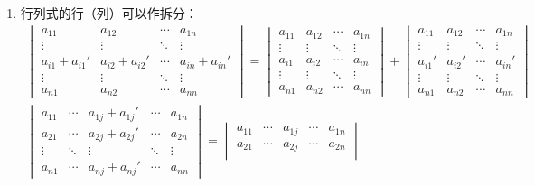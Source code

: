 \begin{property}
\begin{enumerate}
\begin{gather*}
\begin{vmatrix}
				a_{21} & \cdots & a_{2j} & \cdots & a_{2n} \\
				\vdots & \ddots & \vdots & \ddots & \vdots \\
				a_{n1} & \cdots & a_{nj} & \cdots & a_{nn}
			\end{vmatrix}
		\end{gather*}
		\item 行列式的行（列）可以作拆分：
		\begin{gather*}
			\begin{vmatrix}
				a_{11} & a_{12} & \cdots & a_{1n} \\
				\vdots & \vdots & \ddots & \vdots \\
				a_{i1}+a_{i1}' & a_{i2}+a_{i2}' & \cdots & a_{in}+a_{in}' \\
				\vdots & \vdots & \ddots & \vdots \\
				a_{n1} & a_{n2} & \cdots & a_{nn}
			\end{vmatrix}=
			\begin{vmatrix}
				a_{11} & a_{12} & \cdots & a_{1n} \\
				\vdots & \vdots & \ddots & \vdots \\
				a_{i1} & a_{i2} & \cdots & a_{in} \\
				\vdots & \vdots & \ddots & \vdots \\
				a_{n1} & a_{n2} & \cdots & a_{nn}
			\end{vmatrix}+
			\begin{vmatrix}
				a_{11} & a_{12} & \cdots & a_{1n} \\
				\vdots & \vdots & \ddots & \vdots \\
				a_{i1}' & a_{i2}' & \cdots & a_{in}' \\
				\vdots & \vdots & \ddots & \vdots \\
				a_{n1} & a_{n2} & \cdots & a_{nn}
			\end{vmatrix} \\
			\begin{vmatrix}
				a_{11} & \cdots & a_{1j}+a_{1j}' & \cdots & a_{1n} \\
				a_{21} & \cdots & a_{2j}+a_{2j}' & \cdots & a_{2n} \\
				\vdots & \ddots & \vdots & \ddots & \vdots \\
				a_{n1} & \cdots & a_{nj}+a_{nj}' & \cdots & a_{nn}
			\end{vmatrix}=
			\begin{vmatrix}
				a_{11} & \cdots & a_{1j} & \cdots & a_{1n} \\
				a_{21} & \cdots & a_{2j} & \cdots & a_{2n} \\

\end{vmatrix}
\end{gather*}
\end{enumerate}
\end{property}
